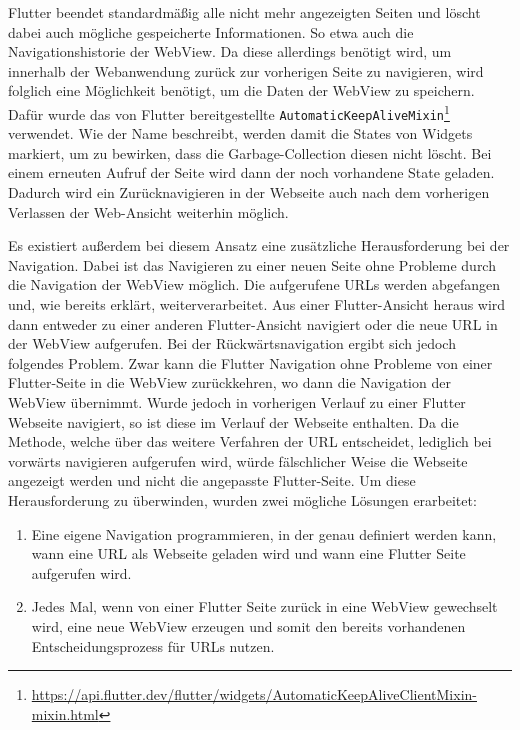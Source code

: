 Flutter beendet standardmäßig alle nicht mehr angezeigten Seiten und löscht dabei auch mögliche gespeicherte Informationen. So etwa auch die Navigationshistorie der WebView.
Da diese allerdings benötigt wird, um innerhalb der Webanwendung zurück zur vorherigen Seite zu navigieren, wird folglich eine Möglichkeit benötigt, um die Daten der WebView zu speichern. Dafür wurde das von Flutter bereitgestellte \verb|AutomaticKeepAliveMixin|\footnote{\url{https://api.flutter.dev/flutter/widgets/AutomaticKeepAliveClientMixin-mixin.html}} verwendet. 
Wie der Name beschreibt, werden damit die States von Widgets markiert, um zu bewirken, dass die Garbage-Collection diesen nicht löscht. 
Bei einem erneuten Aufruf der Seite wird dann der noch vorhandene State geladen. Dadurch wird ein Zurücknavigieren in der Webseite auch nach dem vorherigen Verlassen der Web-Ansicht weiterhin möglich.

Es existiert außerdem bei diesem Ansatz eine zusätzliche Herausforderung bei der Navigation.
Dabei ist das Navigieren zu einer neuen Seite ohne Probleme durch die Navigation der WebView möglich. Die aufgerufene URLs werden abgefangen und, wie bereits erklärt, weiterverarbeitet. Aus einer Flutter-Ansicht heraus wird dann entweder zu einer anderen Flutter-Ansicht navigiert oder die neue URL in der WebView aufgerufen. Bei der Rückwärtsnavigation ergibt sich jedoch folgendes Problem. Zwar kann die Flutter Navigation ohne Probleme von einer Flutter-Seite in die WebView zurückkehren, wo dann die Navigation der WebView übernimmt. Wurde jedoch in vorherigen Verlauf zu einer Flutter Webseite navigiert, so ist diese im Verlauf der Webseite enthalten. Da die Methode, welche über das weitere Verfahren der URL entscheidet, lediglich bei vorwärts navigieren aufgerufen wird, würde fälschlicher Weise die Webseite angezeigt werden und nicht die angepasste Flutter-Seite.
Um diese Herausforderung zu überwinden, wurden zwei mögliche Lösungen erarbeitet:
\begin{enumerate}
    \item Eine eigene Navigation programmieren, in der genau definiert werden kann, wann eine URL als Webseite geladen wird und wann eine Flutter Seite aufgerufen wird. 
    \item Jedes Mal, wenn von einer Flutter Seite zurück in eine WebView gewechselt wird, eine neue WebView erzeugen und somit den bereits vorhandenen Entscheidungsprozess für URLs nutzen. 
\end{enumerate}

